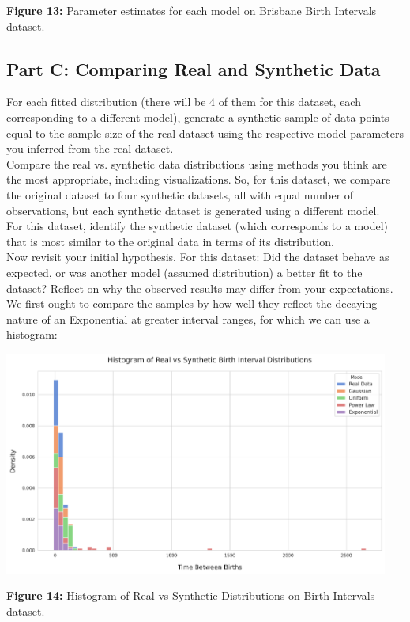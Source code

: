 \begin{center}
\textbf{Figure 13:} Parameter estimates for each model on Brisbane Birth Intervals dataset.
\end{center}

\newpage

\subsection{Part C: Comparing Real and Synthetic Data}

For each fitted distribution (there will be 4 of them for this dataset, each corresponding to a different model), generate a synthetic sample of data points equal to the sample size of the real dataset using the respective model parameters you inferred from the real dataset.\\

Compare the real vs. synthetic data distributions using methods you think are the most appropriate, including visualizations. So, for this dataset, we compare the original dataset to four synthetic datasets, all with equal number of observations, but each synthetic dataset is generated using a different model.\\

For this dataset, identify the synthetic dataset (which corresponds to a model) that is most similar to the original data in terms of its distribution.\\

Now revisit your initial hypothesis. For this dataset: Did the dataset behave as expected, or was another model (assumed distribution) a better fit to the dataset? Reflect on why the observed results may differ from your expectations.\\

We first ought to compare the samples by how well-they reflect the decaying nature of an Exponential at greater interval ranges, for which we can use a histogram:

\begin{center}
  \includegraphics[width=0.95\textwidth]{figures/exponential/histogram.png}
  
  \textbf{Figure 14:} Histogram of Real vs Synthetic Distributions on Birth Intervals dataset.
\end{center}

